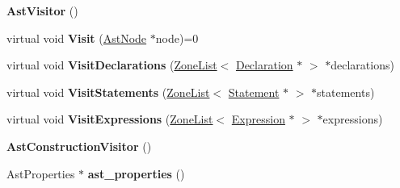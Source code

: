 \begin{DoxyCompactItemize}
\item 
\hypertarget{classv8_1_1internal_1_1_b_a_s_e___e_m_b_e_d_d_e_d_a62e8976b2c7786582ac98a68392d3f0e}{}{\bfseries Ast\+Visitor} ()\label{classv8_1_1internal_1_1_b_a_s_e___e_m_b_e_d_d_e_d_a62e8976b2c7786582ac98a68392d3f0e}

\item 
\hypertarget{classv8_1_1internal_1_1_b_a_s_e___e_m_b_e_d_d_e_d_ae24846bd7a0c4f0ccf25ae5b4db6b52a}{}virtual void {\bfseries Visit} (\hyperlink{classv8_1_1internal_1_1_ast_node}{Ast\+Node} $\ast$node)=0\label{classv8_1_1internal_1_1_b_a_s_e___e_m_b_e_d_d_e_d_ae24846bd7a0c4f0ccf25ae5b4db6b52a}

\item 
\hypertarget{classv8_1_1internal_1_1_b_a_s_e___e_m_b_e_d_d_e_d_a2c684414be175ed4c48c19eb48103f84}{}virtual void {\bfseries Visit\+Declarations} (\hyperlink{classv8_1_1internal_1_1_zone_list}{Zone\+List}$<$ \hyperlink{classv8_1_1internal_1_1_declaration}{Declaration} $\ast$ $>$ $\ast$declarations)\label{classv8_1_1internal_1_1_b_a_s_e___e_m_b_e_d_d_e_d_a2c684414be175ed4c48c19eb48103f84}

\item 
\hypertarget{classv8_1_1internal_1_1_b_a_s_e___e_m_b_e_d_d_e_d_a0cdb5d2925c5039dee2c605f5de64230}{}virtual void {\bfseries Visit\+Statements} (\hyperlink{classv8_1_1internal_1_1_zone_list}{Zone\+List}$<$ \hyperlink{classv8_1_1internal_1_1_statement}{Statement} $\ast$ $>$ $\ast$statements)\label{classv8_1_1internal_1_1_b_a_s_e___e_m_b_e_d_d_e_d_a0cdb5d2925c5039dee2c605f5de64230}

\item 
\hypertarget{classv8_1_1internal_1_1_b_a_s_e___e_m_b_e_d_d_e_d_aca46980072a9930f0f6c991c2632eb2b}{}virtual void {\bfseries Visit\+Expressions} (\hyperlink{classv8_1_1internal_1_1_zone_list}{Zone\+List}$<$ \hyperlink{classv8_1_1internal_1_1_expression}{Expression} $\ast$ $>$ $\ast$expressions)\label{classv8_1_1internal_1_1_b_a_s_e___e_m_b_e_d_d_e_d_aca46980072a9930f0f6c991c2632eb2b}

\item 
\hypertarget{classv8_1_1internal_1_1_b_a_s_e___e_m_b_e_d_d_e_d_aa970be99858fd32470c2657c0a89069e}{}{\bfseries Ast\+Construction\+Visitor} ()\label{classv8_1_1internal_1_1_b_a_s_e___e_m_b_e_d_d_e_d_aa970be99858fd32470c2657c0a89069e}

\item 
\hypertarget{classv8_1_1internal_1_1_b_a_s_e___e_m_b_e_d_d_e_d_ac121a3080c4a5e7f0d944d95db723bed}{}Ast\+Properties $\ast$ {\bfseries ast\+\_\+properties} ()\label{classv8_1_1internal_1_1_b_a_s_e___e_m_b_e_d_d_e_d_ac121a3080c4a5e7f0d944d95db723bed}


\end{DoxyCompactItemize}
